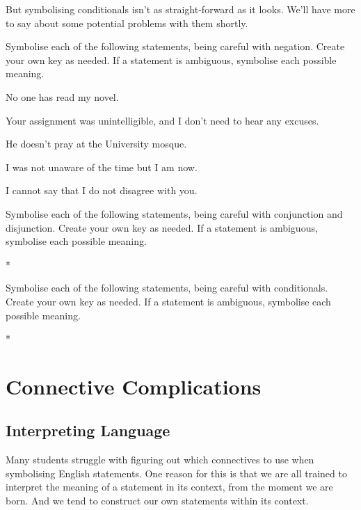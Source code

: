 \documentclass[PHIL101-Textbook.tex]{subfiles}
\begin{document}
But symbolising conditionals isn't as straight-forward as it looks. We'll have more to say about some potential problems with them shortly. 

\pagebreak

\practiceproblems
\noindent%
\problempart\label{pr.connectives.neg}
Symbolise each of the following statements, being careful with negation. Create your own key as needed. If a statement is ambiguous, symbolise each possible meaning.
\begin{earg}
\item No one has read my novel.
\item Your assignment was unintelligible, and I don't need to hear any excuses.
\item He doesn't pray at the University mosque.
\item I was not unaware of the time but I am now.
\item I cannot say that I do not disagree with you.
\end{earg}

\noindent\problempart\label{pr.connectives.conjdisj}
Symbolise each of the following statements, being careful with conjunction and disjunction. Create your own key as needed. If a statement is ambiguous, symbolise each possible meaning.
\begin{earg}
\item **
\end{earg}


\noindent\problempart\label{pr.connectives.cond}
Symbolise each of the following statements, being careful with conditionals. Create your own key as needed. If a statement is ambiguous, symbolise each possible meaning.
\begin{earg}
\item **
\end{earg}

\chapter{Connective Complications}
\label{ch:TFLComplications}

\section{Interpreting Language}

Many students struggle with figuring out which connectives to use when symbolising English statements. One reason for this is that we are all trained to interpret the meaning of a statement in its context, from the moment we are born. And we tend to construct our own statements within its context.
\end{document}
